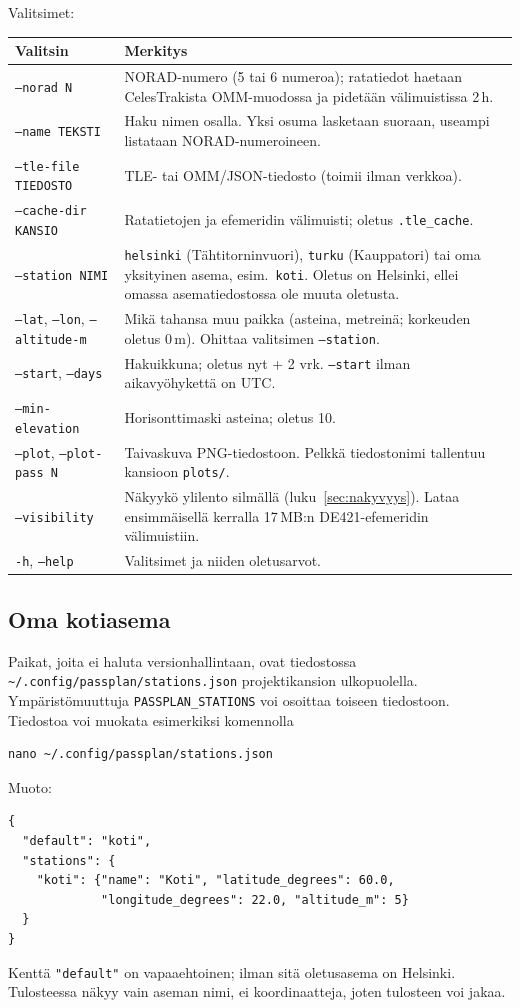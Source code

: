 \documentclass[a4paper,11pt]{article}
\newcommand{\koodi}[1]{\texttt{#1}}
\begin{document}
\noindent Valitsimet:
\begin{center}
\begin{tabularx}{\textwidth}{@{}lL@{}}
\toprule
Valitsin & Merkitys \\
\midrule
\koodi{--norad N} & NORAD-numero (5 tai 6 numeroa); ratatiedot haetaan CelesTrakista
  OMM-muodossa ja pidetään välimuistissa 2\,h. \\
\koodi{--name TEKSTI} & Haku nimen osalla. Yksi osuma lasketaan suoraan, useampi listataan
  NORAD-numeroineen. \\
\koodi{--tle-file TIEDOSTO} & TLE- tai OMM/JSON-tiedosto (toimii ilman verkkoa). \\
\koodi{--cache-dir KANSIO} & Ratatietojen ja efemeridin välimuisti; oletus \koodi{.tle\_cache}. \\
\koodi{--station NIMI} & \koodi{helsinki} (Tähtitorninvuori), \koodi{turku} (Kauppatori) tai oma
  yksityinen asema, esim.\ \koodi{koti}. Oletus on Helsinki, ellei omassa asematiedostossa
  ole muuta oletusta. \\
\koodi{--lat}, \koodi{--lon}, \koodi{--altitude-m} & Mikä tahansa muu paikka (asteina, metreinä;
  korkeuden oletus 0\,m). Ohittaa valitsimen \koodi{--station}. \\
\koodi{--start}, \koodi{--days} & Hakuikkuna; oletus nyt + 2 vrk. \koodi{--start} ilman
  aikavyöhykettä on UTC. \\
\koodi{--min-elevation} & Horisonttimaski asteina; oletus 10. \\
\koodi{--plot}, \koodi{--plot-pass N} & Taivaskuva PNG-tiedostoon. Pelkkä tiedostonimi
  tallentuu kansioon \koodi{plots/}. \\
\koodi{--visibility} & Näkyykö ylilento silmällä (luku~\ref{sec:nakyvyys}). Lataa
  ensimmäisellä kerralla 17\,MB:n DE421-efemeridin välimuistiin. \\
\koodi{-h}, \koodi{--help} & Valitsimet ja niiden oletusarvot. \\
\bottomrule
\end{tabularx}
\end{center}

\subsection{Oma kotiasema}
Paikat, joita ei haluta versionhallintaan, ovat tiedostossa
\koodi{\textasciitilde/.config/passplan/stations.json} projektikansion ulkopuolella.
Ympäristömuuttuja \koodi{PASSPLAN\_STATIONS} voi osoittaa toiseen tiedostoon.
Tiedostoa voi muokata esimerkiksi komennolla
\begin{verbatim}
nano ~/.config/passplan/stations.json
\end{verbatim}
Muoto:
\begin{verbatim}
{
  "default": "koti",
  "stations": {
    "koti": {"name": "Koti", "latitude_degrees": 60.0,
             "longitude_degrees": 22.0, "altitude_m": 5}
  }
}
\end{verbatim}
Kenttä \koodi{"default"} on vapaaehtoinen; ilman sitä oletusasema on Helsinki.
Tulosteessa näkyy vain aseman nimi, ei koordinaatteja, joten tulosteen voi jakaa.
\end{document}
